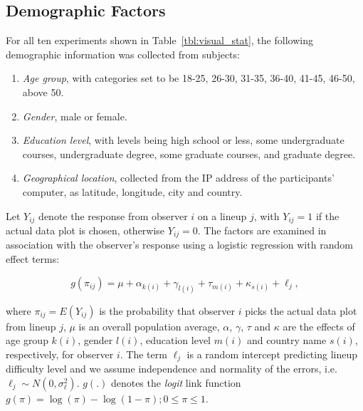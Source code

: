 \documentclass[10pt]{article}\usepackage[]{graphicx}\usepackage[]{xcolor}
\begin{document}
\subsection{Demographic Factors}
\noindent
For all  ten experiments shown in Table~\ref{tbl:visual_stat}, the following demographic information was collected from subjects:

\begin{enumerate} \leftmargin 5cm  \itemsep 0in
\item {\it Age group}, with categories set to be 18-25, 26-30, 31-35, 36-40, 41-45, 46-50, above 50.
\item {\it Gender}, male or female.
\item {\it Education level}, with levels being high school or less, some undergraduate courses, undergraduate degree, some graduate courses, and graduate degree.
\item {\it Geographical location}, collected from the IP address of the participants' computer, as latitude, longitude, city and country. 
\end{enumerate}


Let $Y_{ij}$ denote the response from observer $i$ on a lineup $j$, with $Y_{ij} =1$ if the actual data plot is chosen, otherwise $Y_{ij} =0$. The factors are examined in association with the observer's response using a logistic regression with random effect terms:

\begin{equation} \label{eqn:demographic_response}
g( \pi_{ij} )= \mu + \alpha_{k(i)} + \gamma_{l(i)} + \tau_{m(i)}+ \kappa_{s(i)} + \ell_j,  
\end{equation}

where $\pi_{ij}=  E(Y_{ij})$ is the probability that  observer $i$ picks the actual data plot from lineup $j$, $\mu$ is an overall population average, $\alpha$, $\gamma$, $\tau$ and  $\kappa$ are the effects of age group $k(i)$, gender $l(i)$, education level $m(i)$ and country name $s(i)$, respectively, for observer $i$. The term $\ell_j$ is a random intercept predicting lineup difficulty level and we assume independence and normality of the errors, i.e.\ $\ell_j \sim N(0, \sigma_\ell^2)$.  $g(.)$ denotes the {\it logit} link function $g(\pi)=\log(\pi) - \log(1-\pi); 0 \le \pi \le 1$.
\end{document}
